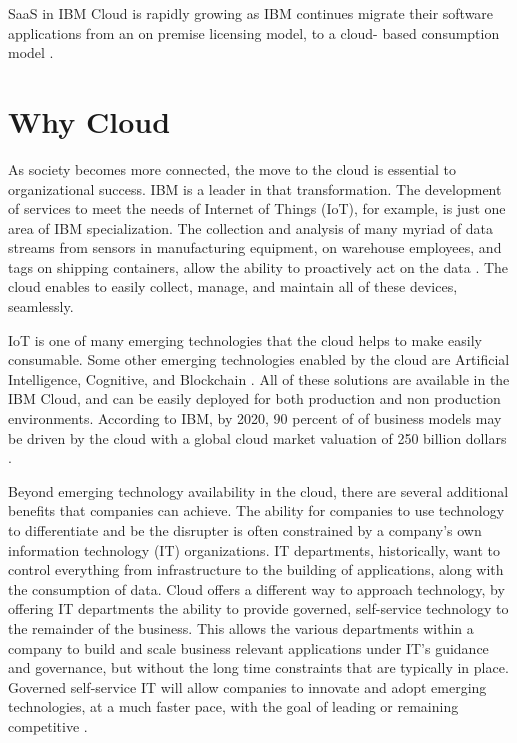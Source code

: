 SaaS in IBM Cloud is rapidly growing as IBM continues migrate their
software applications from an on premise licensing model, to a cloud-
based consumption model \cite {hid-sp18-525-overview}.


\section{Why Cloud}

As society becomes more connected, the move to the cloud is essential to  organizational success.  IBM is a leader in that transformation.  
The development of services to meet the needs of Internet of Things (IoT), for example, is just one area of IBM specialization. The collection and analysis of many myriad of data streams from sensors in manufacturing equipment, on warehouse employees, and tags on shipping containers, allow the ability to proactively act on the data \cite{hid-sp18-525-winning}.  The cloud enables to easily collect, manage, and maintain all of these devices, seamlessly. 

IoT is one of many emerging technologies that the cloud helps to make easily consumable. Some other emerging technologies enabled by the cloud are Artificial Intelligence, Cognitive, and Blockchain \cite{hid-sp18-525-winning}.  All of these solutions are available in the IBM Cloud, and can be easily deployed for both production and non production environments.  According to IBM, by 2020, 90 percent of of business models may be driven by the cloud with a global cloud market valuation of 250 billion dollars  \cite{hid-sp18-525-winning}.

Beyond emerging technology availability in the cloud, there are several additional benefits that companies can achieve.  The ability for companies to use technology to differentiate and be the disrupter is often constrained by a company's own information technology (IT) organizations.  IT departments, historically, want to control everything from infrastructure to the building of applications, along with the consumption of data.  Cloud offers a different way to approach technology, by offering IT departments the ability to provide governed, self-service technology to the remainder of the business.  This allows the various departments within a company to build and scale business relevant applications under IT's guidance and governance, but without the long time constraints that are typically in place. Governed self-service IT will allow companies to innovate and adopt emerging technologies, at a much faster pace, with the goal of leading or remaining competitive \cite{hid-sp18-525-overview}.


